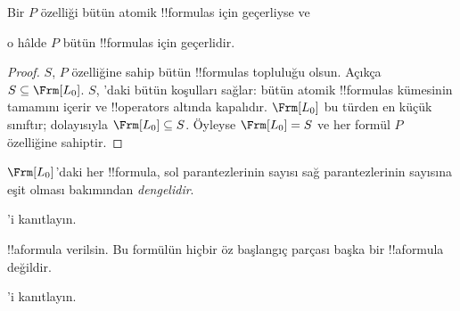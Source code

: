 



\begin{thm}
  Bir $P$ özelliği bütün atomik !!{formula}s için geçerliyse ve
  \begin{enumerate}
  \end{enumerate}
  o hâlde $P$ bütün !!{formula}s için geçerlidir.
\end{thm}

\begin{proof}
  $S$, $P$ özelliğine sahip bütün !!{formula}s topluluğu olsun. Açıkça
  $S \subseteq \Frm[L_0]$. $S$, 'daki bütün
  koşulları sağlar: bütün atomik !!{formula}s kümesinin tamamını içerir ve
  !!{operator}s
  altında kapalıdır. $\Frm[L_0]$ bu türden en küçük sınıftır; dolayısıyla
  $\Frm[L_0] \subseteq S$. Öyleyse $\Frm[L_0] = S$ ve her formül $P$
  özelliğine sahiptir.
\end{proof}

\begin{prop}
   $\Frm[L_0]$'daki her !!{formula}, sol parantezlerinin sayısı sağ
   parantezlerinin sayısına eşit olması bakımından \emph{dengelidir}.
\end{prop}

\begin{prob}
'i kanıtlayın.
\end{prob}

\begin{prop} 
!!a{formula} verilsin. Bu formülün hiçbir öz başlangıç parçası başka bir
!!a{formula} değildir.
\end{prop}

\begin{prob}
  'i kanıtlayın.
\end{prob}

